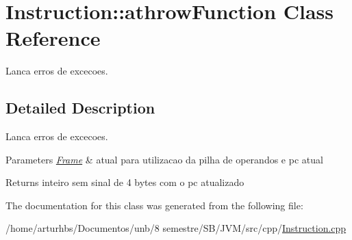 \hypertarget{classInstruction_1_1athrowFunction}{}\section{Instruction\+:\+:athrow\+Function Class Reference}
\label{classInstruction_1_1athrowFunction}


Lanca erros de excecoes.  




\subsection{Detailed Description}
Lanca erros de excecoes. 


\begin{DoxyParams}{Parameters}
{\em \hyperlink{classFrame}{Frame}} & atual para utilizacao da pilha de operandos e pc atual \\
\hline
\end{DoxyParams}
\begin{DoxyReturn}{Returns}
inteiro sem sinal de 4 bytes com o pc atualizado 
\end{DoxyReturn}


The documentation for this class was generated from the following file\+:\begin{DoxyCompactItemize}
\item 
/home/arturhbs/\+Documentos/unb/8 semestre/\+S\+B/\+J\+V\+M/src/cpp/\hyperlink{Instruction_8cpp}{Instruction.\+cpp}\end{DoxyCompactItemize}
